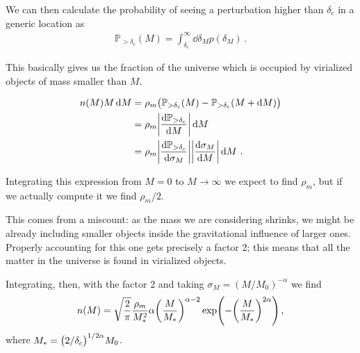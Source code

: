 \documentclass[main.tex]{subfiles}
\begin{document}

We can then calculate the probability of seeing a perturbation higher than \(\delta _c\) in a generic location as
%
\begin{align}
\mathbb{P}_{> \delta_{c}}(M) = \int_{ \delta_{c}}^{ \infty } \dd{ \delta_{M}} p( \delta_{M})
\,.
\end{align}

This basically gives us the fraction of the universe which is occupied by virialized objects of mass smaller than \(M\). 

%
\begin{subequations}
\begin{align}
n(M) M \dd{M} 
&= \rho_{m} \qty(\mathbb{P}_{ > \delta_{c}} (M) - \mathbb{P}_{ > \delta_{c}} (M + \dd{M})) \\
&= \rho_{m} \abs{ \dv{\mathbb{P}_{> \delta_{c}}}{M}} \dd{M}  \\
&= \rho_{m} \abs{ \dv{\mathbb{P}_{> \delta_{c}}}{ \sigma_{M}}} \abs{ \dv{\sigma_{M}}{M}} \dd{M}
\,.
\end{align}
\end{subequations}

Integrating this expression from \(M=0\) to \(M \to \infty \) we expect to find \(\rho _m\), but if we actually compute it we find \(\rho _m / 2\). 

This comes from a miscount: as the mass we are considering shrinks, we might be already including smaller objects inside the gravitational influence of larger ones.
Properly accounting for this one gets precisely a factor 2; this means that all the matter in the universe is found in virialized objects.

Integrating, then, with the factor \(2\) and taking \(\sigma _M = (M / M_0 )^{- \alpha }\) we find
%
\begin{align}
n(M) = \sqrt{ \frac{2}{\pi }} \frac{\rho_{m}}{M_{*}^2}
\alpha \qty(\frac{M}{M_{*}})^{\alpha -2 }
\exp(- \qty(\frac{M}{M_{*}})^{2 \alpha })
\,,
\end{align}
%
where \(M_{*} = \qty(2 / \delta_{c})^{ 1/ 2 \alpha } M_0 \). 
\end{document}
